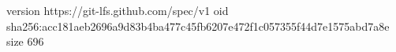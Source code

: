 version https://git-lfs.github.com/spec/v1
oid sha256:acc181aeb2696a9d83b4ba477c45fb6207e472f1c057355f44d7e1575abd7a8e
size 696
